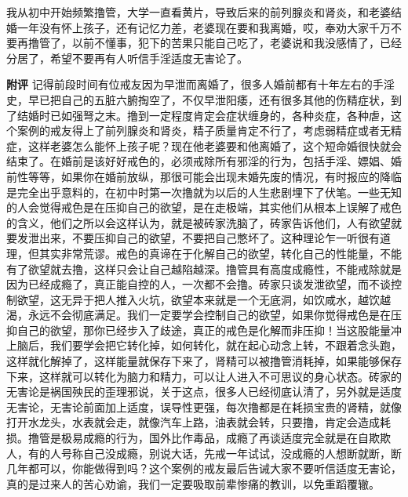 \begin{case}
    我从初中开始频繁撸管，大学一直看黄片，导致后来的前列腺炎和肾炎，和老婆结婚一年没有怀上孩子，还有记忆力差，老婆现在要和我离婚，哎，奉劝大家千万不要再撸管了，以前不懂事，犯下的苦果只能自己吃了，老婆说和我没感情了，已经分居了，希望不要再有人听信手淫适度无害论了。

    \textbf{附评} 记得前段时间有位戒友因为早泄而离婚了，很多人婚前都有十年左右的手淫史，早已把自己的五脏六腑掏空了，不仅早泄阳痿，还有很多其他的伤精症状，到了结婚时已如强弩之末。撸到一定程度肯定会症状缠身的，各种炎症，各种虐，这个案例的戒友得上了前列腺炎和肾炎，精子质量肯定不行了，考虑弱精症或者无精症，这样老婆怎么能怀上孩子呢？现在他老婆要和他离婚了，这个短命婚很快就会结束了。在婚前是该好好戒色的，必须戒除所有邪淫的行为，包括手淫、嫖娼、婚前性等等，如果你在婚前放纵，那很可能会出现未婚先废的情况，有时报应的降临是完全出乎意料的，在初中时第一次撸就为以后的人生悲剧埋下了伏笔。一些无知的人会觉得戒色是在压抑自己的欲望，是在走极端，其实他们从根本上误解了戒色的含义，他们之所以会这样认为，就是被砖家洗脑了，砖家告诉他们，人有欲望就要发泄出来，不要压抑自己的欲望，不要把自己憋坏了。这种理论乍一听很有道理，但其实非常荒谬。戒色的真谛在于化解自己的欲望，转化自己的性能量，不能有了欲望就去撸，这样只会让自己越陷越深。撸管具有高度成瘾性，不能戒除就是因为已经成瘾了，真正能自控的人，一次都不会撸。砖家只谈发泄欲望，而不谈控制欲望，这无异于把人推入火坑，欲望本来就是一个无底洞，如饮咸水，越饮越渴，永远不会彻底满足。我们一定要学会控制自己的欲望，如果你觉得戒色是在压抑自己的欲望，那你已经步入了歧途，真正的戒色是化解而非压抑！当这股能量冲上脑后，我们要学会把它转化掉，如何转化，就在起心动念上转，不跟着念头跑，这样就化解掉了，这样能量就保存下来了，肾精可以被撸管消耗掉，如果能够保存下来，这样就可以转化为脑力和精力，可以让人进入不可思议的身心状态。砖家的无害论是祸国殃民的歪理邪说，关于这点，很多人已经彻底认清了，另外就是适度无害论，无害论前面加上适度，误导性更强，每次撸都是在耗损宝贵的肾精，就像打开水龙头，水表就会走，就像汽车上路，油表就会转，只要撸，肯定会造成耗损。撸管是极易成瘾的行为，国外比作毒品，成瘾了再谈适度完全就是在自欺欺人，有的人号称自己没成瘾，别说大话，先戒一年试试，没成瘾的人想断就断，断几年都可以，你能做得到吗？这个案例的戒友最后告诫大家不要听信适度无害论，真的是过来人的苦心劝谕，我们一定要吸取前辈惨痛的教训，以免重蹈覆辙。
\end{case}


